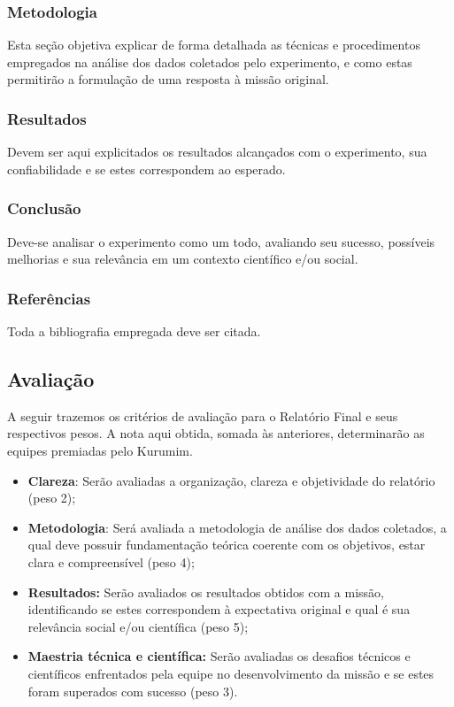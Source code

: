         \subsubsection{Metodologia}
            Esta seção objetiva explicar de forma detalhada as técnicas e procedimentos empregados na análise dos dados coletados pelo experimento, e como estas permitirão a formulação de uma resposta à missão original.

        \subsubsection{Resultados}
            Devem ser aqui explicitados os resultados alcançados com o experimento, sua confiabilidade e se estes correspondem ao esperado.

        \subsubsection{Conclusão}
            Deve-se analisar o experimento como um todo, avaliando seu sucesso, possíveis melhorias e sua relevância em um contexto científico e/ou social.

        \subsubsection{Referências}
            Toda a bibliografia empregada deve ser citada.

     \subsection{Avaliação}
        A seguir trazemos os critérios de avaliação para o Relatório Final e seus respectivos pesos. A nota aqui obtida, somada às anteriores, determinarão as equipes premiadas pelo Kurumim.
        
        \begin{itemize}
            \item \textbf{Clareza}: Serão avaliadas a organização, clareza e objetividade do relatório (peso 2);
            
            \item \textbf{Metodologia}: Será avaliada a metodologia de análise dos dados coletados, a qual deve possuir fundamentação teórica coerente com os objetivos, estar clara e compreensível (peso 4);

            \item \textbf{Resultados:} Serão avaliados os resultados obtidos com a missão, identificando se estes correspondem à expectativa original e qual é sua relevância social e/ou científica (peso 5);

            \item \textbf{Maestria técnica e científica:} Serão avaliadas os desafios técnicos e científicos enfrentados pela equipe no desenvolvimento da missão e se estes foram superados com sucesso (peso 3).
        \end{itemize}
        
